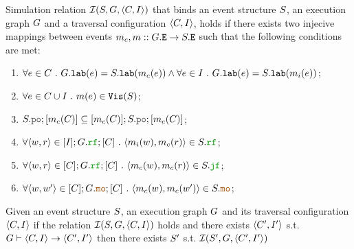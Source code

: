 \documentclass[12pt]{article}
\begin{document}
\begin{definition}
  Simulation relation $\mathcal{I}(S, G, \langle C, I \rangle)$ that binds an 
  event structure $S$, an \imm execution graph $G$ and 
  a traversal configuration $\langle C, I \rangle$,
  holds if there exists two injecive mappings between events 
  $m_{c}, m :: G.{\mathtt{E}} \rightarrow S.{\mathtt{E}}$
  such that the following conditions are met:
  \begin{enumerate}[label=\textbf{S.\arabic*}]
    \item \label{item:sim-lab}
      $\forall{e \in C} ~.~ G.{\mathtt{lab}}(e) = S.{\mathtt{lab}}(m_{c}(e)) \wedge
       \forall{e \in I} ~.~ G.{\mathtt{lab}}(e) = S.{\mathtt{lab}}(m_{i}(e))$;
    \item \label{item:sim-vis} 
      $\forall{e \in C\cup I} ~.~ m(e) \in {\mathtt{Vis}}(S)$;
    \item \label{item:sim-po} 
      $\lES.\lPO;[\lMC(\lC)] \subseteq [\lMC(\lC)];\lES.\lPO;[\lMC(\lC)]$;
    \item \label{item:sim-rf-i} 
      $\forall{\tup{w, r} \in [\lI];\lG.\lRF;[\lC] ~.~ \tup{\lMI(w), \lMC(r)} \in \lES.\lRF}$;
    \item \label{item:sim-rf-c} 
      $\forall{\tup{w, r} \in [\lC];\lG.\lRF;[\lC] ~.~ \tup{\lMC(w), \lMC(r)} \in \lES.\lJF}$;
    \item \label{item:sim-mo}
      $\forall{\tup{w, w'} \in [\lC];\lG.\lMO;[\lC] ~.~ \tup{\lMC(w), \lMC(w')} \in \lES.\lMO}$;
  \end{enumerate}
\end{definition}

\begin{lemma}
  Given an event structure $S$, an \imm execution graph $G$ 
  and its traversal configuration $\langle C, I \rangle$
  if the relation $\mathcal{I}(S, G, \langle C, I \rangle)$ holds and 
  there exists $\langle C', I' \rangle$ s.t. $G \vdash \langle C, I \rangle \rightarrow \langle C', I' \rangle$
  then there exists $S'$ s.t. $\mathcal{I}(S', G, \langle C', I' \rangle)$ 
\end{lemma}
\end{document}
